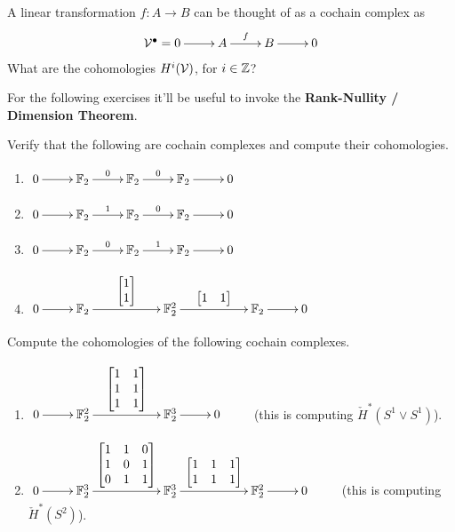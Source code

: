 \begin{ques}
  A linear transformation $ f:A \rightarrow B$ can be thought of as a cochain complex as
  \begin{align*}
    \xymatrix{ \V^\bullet= 0 \ar[r] & A \ar^f[r] & B \ar[r] & 0}
  \end{align*}
  What are the cohomologies $ H^i(\mathcal{V})$, for $ i \in \mathbb{Z}$?
\end{ques}
For the following exercises it'll be useful to invoke the {\bf Rank-Nullity / Dimension Theorem}.
\begin{ques} Verify that the following are cochain complexes and compute their cohomologies.
  \begin{enumerate}
    \item $ \xymatrix{0 \ar[r] & \F \ar^{0}[r] & \F \ar^{0}[r] & \F \ar[r] & 0 }  $
    \item $ \xymatrix{0 \ar[r] & \F \ar^{1}[r] & \F \ar^{0}[r] & \F \ar[r] & 0 }  $
    \item $ \xymatrix{0 \ar[r] & \F \ar^{0}[r] & \F \ar^{1}[r] & \F \ar[r] & 0 }  $
    \item $ \xymatrix{0 \ar[r] & \F \ar^{\begin{bmatrix}1 \\ 1 \end{bmatrix}}[rr]  && \F^2  \ar^{\begin{bmatrix}1 & 1 \end{bmatrix}}[rr] && \F \ar[r] & 0 }  $
  \end{enumerate}
\end{ques}

\begin{ques} Compute the cohomologies of the following cochain complexes.
  \begin{enumerate}
    \item $ \xymatrix{0 \ar[r] & \F^2 \ar^{\begin{bmatrix}1 & 1 \\ 1 & 1 \\ 1 & 1 \end{bmatrix}}[rr] && \F^3 \ar[r] & 0 } \qquad $ (this is computing $\check H^* (S^1 \vee S^1)$).
    \item $ \xymatrix{0 \ar[r] & \F^3 \ar^{\begin{bmatrix}1 & 1 & 0\\ 1 & 0 & 1 \\ 0 & 1 & 1 \end{bmatrix}}[rr] && \F^3 \ar^{\begin{bmatrix}1 & 1 & 1\\ 1 & 1 & 1 \end{bmatrix}}[rr] && \F^2 \ar[r] & 0 } \qquad $ (this is computing $\check H^* (S^2)$).
  \end{enumerate}
\end{ques}

